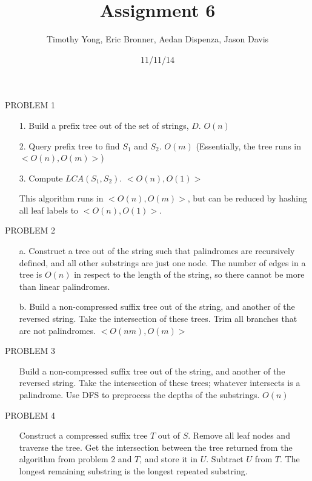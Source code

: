 \documentclass[a4paper]{article}
\title{Assignment 6}
\author{Timothy Yong, Eric Bronner, Aedan Dispenza, Jason Davis}
\date{11/11/14}
\begin{document}
\maketitle

\bigskip

\noindent PROBLEM 1

\begin{enumerate}

\item[1.] Build a prefix tree out of the set of strings, $D$.  $O(n)$
\item[2.] Query prefix tree to find $S_1$ and $S_2$. $O(m)$ (Essentially, the tree runs in $<O(n), O(m)>$)
\item[3.] Compute $LCA(S_1,S_2)$. $<O(n), O(1)>$ 

\item[] This algorithm runs in $<O(n), O(m)>$, but can be reduced by hashing all leaf labels to $<O(n), O(1)>$.

\end{enumerate}

\bigskip
\bigskip

\noindent PROBLEM 2

\begin{enumerate}

\item[a.] Construct a tree out of the string such that palindromes are recursively defined, and all other substrings are just one node. The number of edges in a tree is $O(n)$ in respect to the length of the string, so there cannot be more than linear palindromes.

 \item[b.] Build a non-compressed suffix tree out of the string, and another of the reversed string. Take the intersection of these trees. Trim all branches that are not palindromes.  $<O(nm), O(m)>$

\end{enumerate}

\bigskip
\bigskip

\noindent PROBLEM 3

\begin{enumerate}

\item[]  Build a non-compressed suffix tree out of the string, and another of the reversed string. Take the intersection of these trees; whatever intersects is a palindrome. Use DFS to preprocess the depths of the substrings. $O(n)$

\end{enumerate}

\bigskip
\bigskip

\noindent PROBLEM 4

\begin{enumerate}

\item[]  Construct a compressed suffix tree $T$ out of $S$. Remove all leaf nodes and traverse the tree. Get the intersection between the tree returned from the algorithm from problem 2 and $T$, and store it in $U$. Subtract $U$ from $T$. The longest remaining substring is the longest repeated substring.

\end{enumerate}
\end{document}
